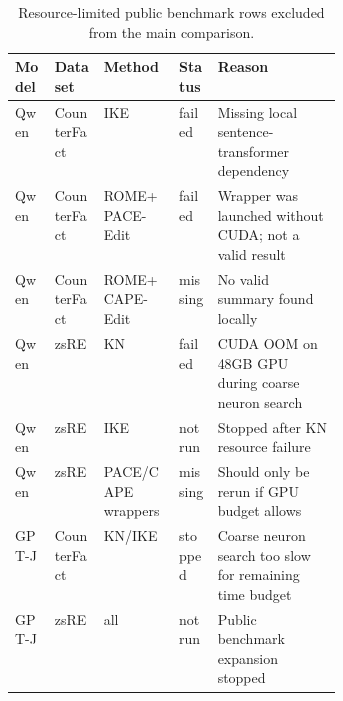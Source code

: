 \begin{table}[t]
\centering
\small
\caption{Resource-limited public benchmark rows excluded from the main comparison.}
\label{tab:runtime-limits}
\begin{tabular}{llllp{0.38\linewidth}}
\toprule
Model & Dataset & Method & Status & Reason \\
\midrule
Qwen & CounterFact & IKE & failed & Missing local sentence-transformer dependency \\
Qwen & CounterFact & ROME+PACE-Edit & failed & Wrapper was launched without CUDA; not a valid result \\
Qwen & CounterFact & ROME+CAPE-Edit & missing & No valid summary found locally \\
Qwen & zsRE & KN & failed & CUDA OOM on 48GB GPU during coarse neuron search \\
Qwen & zsRE & IKE & not run & Stopped after KN resource failure \\
Qwen & zsRE & PACE/CAPE wrappers & missing & Should only be rerun if GPU budget allows \\
GPT-J & CounterFact & KN/IKE & stopped & Coarse neuron search too slow for remaining time budget \\
GPT-J & zsRE & all & not run & Public benchmark expansion stopped \\
\bottomrule
\end{tabular}
\end{table}
